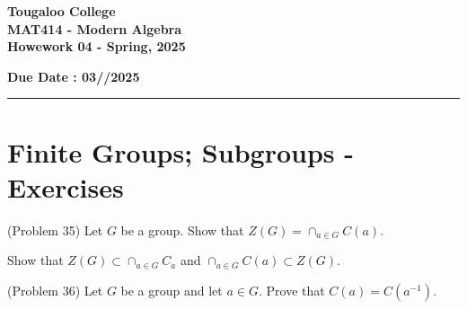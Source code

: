 \documentclass[12pt]{exam}
\newcommand{\paper}[5]{
    \setcounter{page}{1}
    
    \begin{minipage}{\textwidth}
    \Large{\textbf{Tougaloo College}}\\
    \textbf{#2}\\
    \textbf{#5 - #3}\\
    \end{minipage}
    \hfill
        \begin{minipage}{6in}
            \textbf{\hspace{0.25in}Due Date : #1}
        \end{minipage}
    
    \vspace{0.1in}
    \rule[1ex]{\textwidth}{2pt}
    }
\begin{document}
\paper{03//2025}{MAT414 - Modern Algebra}{Spring, 2025}{}{Howework 04}

\section*{Finite Groups; Subgroups - Exercises}
\begin{questions}



\question[20] (Problem 35) Let \(G\) be a group. Show that \(Z(G)=\cap_{a \in G} C(a)\).

\begin{solution}
    Show that \(Z(G) \subset \cap_{a\in G}C_a\) and \(\cap_{a\in G} C(a) \subset Z(G)\).
\end{solution}
\droptotalpoints

\question[20] (Problem 36) Let \(G\) be a group and let \(a \in G\). Prove that \(C(a) = C(a^{-1}).\)








\end{questions}
\end{document}
